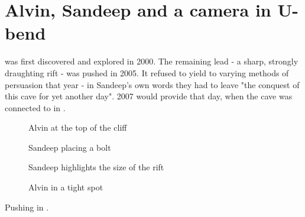 \section{Alvin, Sandeep and a camera in U-bend}


 was first discovered and explored in 2000. The remaining lead - a sharp, strongly draughting rift - was pushed in 2005. It refused to yield to varying methods of persuasion that year - in Sandeep's own words they had to leave "the conquest of this cave for yet another day". 2007 would provide that day, when the cave was connected to  in .


\begin{pagefigure}
      \checkoddpage \ifoddpage \forcerectofloat \else \forceversofloat \fi
    \centering
    \begin{subfigure}{0.49\textwidth}
        \caption{Alvin at the top of the cliff}
    \end{subfigure}
\hfill
    \begin{subfigure}{0.49\textwidth}
    \centering
        \caption{Sandeep placing a bolt}
\end{subfigure}
\vfill
\begin{subfigure}{0.49\textwidth}
    \centering
        \caption{Sandeep highlights the size of the rift}
\end{subfigure}
\hfill
\begin{subfigure}{0.49\textwidth}
    \centering
        \caption{Alvin in a tight spot}
    \end{subfigure}
\vfill
\caption{Pushing in \protect{}. }
\end{pagefigure}


